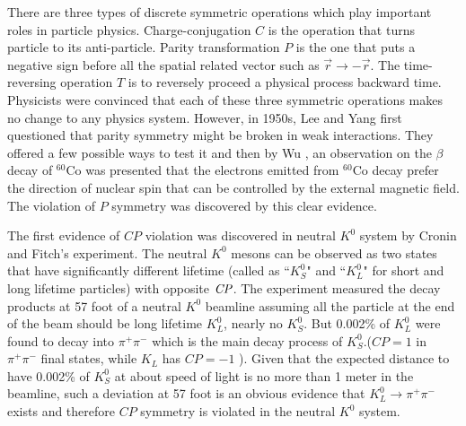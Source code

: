 There are three types of discrete symmetric operations which play important roles in particle physics. Charge-conjugation $\textit{C}$ is the operation that turns particle to its anti-particle. Parity transformation $\textit{P}$  is the one that puts a negative sign before all the spatial related vector such as $\overrightarrow{r} \to -\overrightarrow{r}$. The time-reversing operation $\textit{T}$ is to reversely proceed a physical process backward time.  Physicists were convinced that each of these three symmetric operations makes no change to any physics system. However, in 1950s, Lee and Yang \cite{PhysRev.104.254} first questioned that parity symmetry might be broken in weak interactions. They offered a few possible ways to test it and then by Wu \cite{Wu_exp}, an observation on the $\beta$ decay of $^{60}$Co was presented that the electrons emitted from  $^{60}$Co decay prefer the direction of nuclear spin that can be controlled by the external magnetic field. The violation of $P$ symmetry was discovered by this clear evidence. 

\begin{comment}
\begin{figure}[htbp]
\centering
\texttt{[image: DsBxU.jpg]}
\caption{$^{60}$Co decay violates the parity because of the unbalance of electron emissions\cite{wu_exp}}
\label{fig:Co60}
\end{figure}
\end{comment}

The first evidence of $CP$ violation was discovered in neutral $K^0$ system by Cronin and Fitch's experiment\cite{christenson1964evidence}. The neutral $K^0$ mesons can be observed as two states that have significantly different lifetime (called as ``$K_S^0$" and ``$K_L^0$" for short and long lifetime particles) with opposite $\it{CP}$. The experiment measured the decay products at 57 foot of a neutral $K^0$ beamline assuming all the particle at the end of the beam should be long lifetime $K_L^0$, nearly no $K_S^0$. But 0.002\% of $K^0_L$ were found to decay into $\pi^+\pi^-$ which is the main decay process of $K_S^0$.($CP=1$ in $\pi^+\pi^-$ final states, while $K_L$ has  $CP=-1$ ). Given that the expected distance to have 0.002\% of $K_S^0$ at about speed of light is no more than 1 meter in the beamline, such a deviation at 57 foot is an obvious evidence that $K_L^0 \to \pi^+\pi^- $ exists and therefore $CP$ symmetry is violated in the neutral $K^0$ system.

